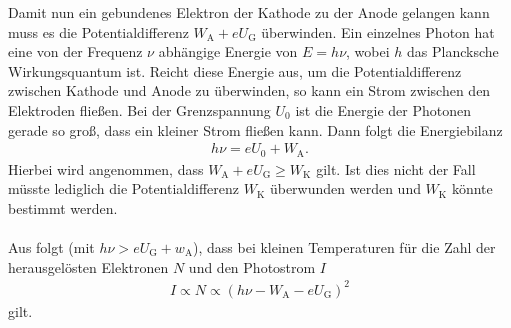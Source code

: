 Damit nun ein gebundenes Elektron der Kathode zu der Anode gelangen kann muss es die Potentialdifferenz $W_\mathrm{A}+eU_\mathrm{G}$ überwinden. Ein einzelnes Photon hat eine von der Frequenz $\nu$ abhängige Energie von $E=h\nu$, wobei $h$ das Plancksche Wirkungsquantum ist. Reicht diese Energie aus, um die Potentialdifferenz zwischen Kathode und Anode zu überwinden, so kann ein Strom zwischen den Elektroden fließen. Bei der Grenzspannung $U_0$ ist die Energie der Photonen gerade so groß, dass ein kleiner Strom fließen kann. Dann folgt die Energiebilanz
\begin{align}
  h\nu=eU_0+W_\mathrm{A}.
\end{align}
Hierbei wird angenommen, dass $W_\mathrm{A}+eU_\mathrm{G} \geq W_\mathrm{K}$ gilt. Ist dies nicht der Fall müsste lediglich die Potentialdifferenz $W_\mathrm{K}$ überwunden werden und $W_\mathrm{K}$ könnte bestimmt werden. \\ \\
Aus \cite{kennlinie} folgt (mit $h\nu>eU_\mathrm{G}+w_\mathrm{A}$), dass bei kleinen Temperaturen für die Zahl der herausgelösten Elektronen $N$ und den Photostrom $I$
\begin{align}
  I \propto N \propto \left(  h\nu-W_\mathrm{A}-eU_\mathrm{G}\right)^2
\end{align} 
gilt. 

\newpage
